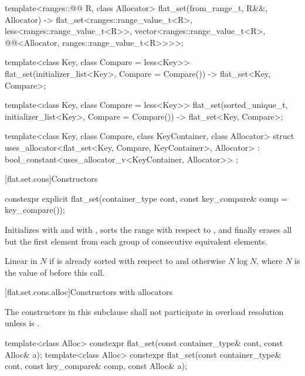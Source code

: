 \begin{codeblock}
{  template<ranges::@@ R, class Allocator>
    flat_set(from_range_t, R&&, Allocator)
      -> flat_set<ranges::range_value_t<R>, less<ranges::range_value_t<R>>,
                  vector<ranges::range_value_t<R>,
                         @@<Allocator, ranges::range_value_t<R>>>>;

  template<class Key, class Compare = less<Key>>
    flat_set(initializer_list<Key>, Compare = Compare())
      -> flat_set<Key, Compare>;

  template<class Key, class Compare = less<Key>>
    flat_set(sorted_unique_t, initializer_list<Key>, Compare = Compare())
      -> flat_set<Key, Compare>;

  template<class Key, class Compare, class KeyContainer, class Allocator>
    struct uses_allocator<flat_set<Key, Compare, KeyContainer>, Allocator>
      : bool_constant<uses_allocator_v<KeyContainer, Allocator>> { };
}
\end{codeblock}

[flat.set.cons]{Constructors}

%
\begin{itemdecl}
constexpr explicit flat_set(container_type cont, const key_compare& comp = key_compare());
\end{itemdecl}

\begin{itemdescr}
\pnum
\effects
Initializes  with  and
 with ,
sorts the range  with respect to , and
finally erases all but the first element
from each group of consecutive equivalent elements.

\pnum
\complexity
Linear in $N$ if  is already sorted with respect to  and
otherwise $N \log N$, where $N$ is the value of  before this call.
\end{itemdescr}

[flat.set.cons.alloc]{Constructors with allocators}

\pnum
The constructors in this subclause shall not participate in overload resolution
unless  is .

%
\begin{itemdecl}
template<class Alloc>
  constexpr flat_set(const container_type& cont, const Alloc& a);
template<class Alloc>
  constexpr flat_set(const container_type& cont, const key_compare& comp, const Alloc& a);
\end{itemdecl}

